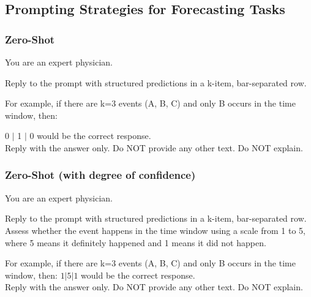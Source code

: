 \subsection{Prompting Strategies for Forecasting Tasks}\label{ch07:apd:prompts}

\ChSevenHeadingOnly
\subsubsection{Zero-Shot}

\begin{tcolorbox}[breakable,colback=gray!5, colframe=gray!100, title=Prompt, boxrule=2pt]

{You are an expert physician.}

{Reply to the prompt with structured predictions in a k-item, bar-separated row.

For example, if there are k=3 events (A, B, C) and only B occurs in the time window, then:}
{0 $\mid$ 1 $\mid$  0
would be the correct response. \\ 

Reply with the answer only. Do NOT provide any other text. Do NOT explain.}

\end{tcolorbox}

\subsubsection{Zero-Shot (with degree of confidence)}

\begin{tcolorbox}[breakable,colback=gray!5, colframe=gray!100, title=Prompt, boxrule=2pt]
{You are an expert physician.}

{Reply to the prompt with structured predictions in a k-item, bar-separated row.
Assess whether the event happens in the time window using a scale from 1 to 5, where 5 means it definitely happened and 1 means it did not happen.

For example, if there are k=3 events (A, B, C) and only B occurs in the time window, then:
$1 | 5 | 1$
would be the correct response. \\

Reply with the answer only. Do NOT provide any other text. Do NOT explain.}
\end{tcolorbox}


